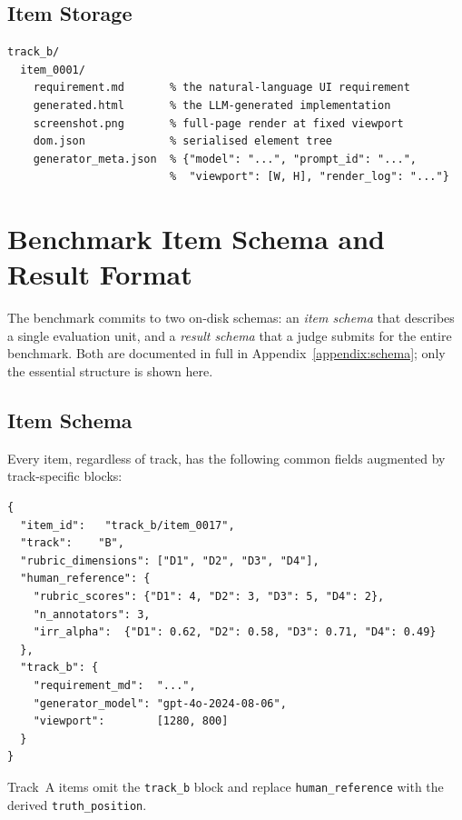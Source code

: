 \subsection{Item Storage}

\begin{lstlisting}[basicstyle=\ttfamily\small]
track_b/
  item_0001/
    requirement.md       % the natural-language UI requirement
    generated.html       % the LLM-generated implementation
    screenshot.png       % full-page render at fixed viewport
    dom.json             % serialised element tree
    generator_meta.json  % {"model": "...", "prompt_id": "...",
                         %  "viewport": [W, H], "render_log": "..."}
\end{lstlisting}

\section{Benchmark Item Schema and Result Format}
\label{sec:item-schema}

The benchmark commits to two on-disk schemas: an \emph{item schema} that
describes a single evaluation unit, and a \emph{result schema} that a
judge submits for the entire benchmark. Both are documented in full in
Appendix~\ref{appendix:schema}; only the essential structure is shown
here.

\subsection{Item Schema}

Every item, regardless of track, has the following common fields
augmented by track-specific blocks:

\begin{lstlisting}[basicstyle=\ttfamily\small]
{
  "item_id":   "track_b/item_0017",
  "track":    "B",
  "rubric_dimensions": ["D1", "D2", "D3", "D4"],
  "human_reference": {
    "rubric_scores": {"D1": 4, "D2": 3, "D3": 5, "D4": 2},
    "n_annotators": 3,
    "irr_alpha":  {"D1": 0.62, "D2": 0.58, "D3": 0.71, "D4": 0.49}
  },
  "track_b": {
    "requirement_md":  "...",
    "generator_model": "gpt-4o-2024-08-06",
    "viewport":        [1280, 800]
  }
}
\end{lstlisting}

Track~A items omit the \texttt{track\_b} block and replace
\texttt{human\_reference} with the derived \texttt{truth\_position}.

